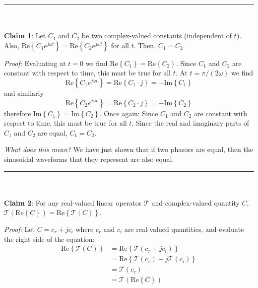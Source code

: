 \rule{3in}{1pt}\\~\\

{\bf Claim 1}: Let $C_1$ and $C_2$ be two complex-valued constants (independent of $t$).  Also,  $\mbox{Re} \left\{ C_1 e^{j\omega t} \right\} = \mbox{Re} \left\{ C_2 e^{j\omega t} \right\}$ for all $t$.  Then, $C_1=C_2$. 

{\it Proof:} Evaluating at $t=0$ we find $\mbox{Re} \left\{ C_1 \right\} = \mbox{Re} \left\{ C_2 \right\}$.  Since $C_1$ and $C_2$ are constant with respect to time, this must be true for all $t$.  At $t=\pi/(2\omega)$ we find
%
\begin{equation}
\mbox{R{e}} \left\{ C_1 e^{j\omega t} \right\} = \mbox{R{e}} \left\{ C_1 \cdot j \right\} = -\mbox{Im} \left\{ C_1 \right\}
\nonumber
\end{equation}
%
and similarly
%
\begin{equation}
\mbox{R{e}} \left\{ C_2 e^{j\omega t} \right\} = \mbox{R{e}} \left\{ C_2 \cdot j \right\} = -\mbox{Im} \left\{ C_2 \right\}
\nonumber
\end{equation}
%
therefore $\mbox{Im} \left\{ C_1 \right\} = \mbox{Im} \left\{ C_2 \right\}$. Once again: Since $C_1$ and $C_2$ are constant with respect to time, this must be true for all $t$.  Since the real and imaginary parts of $C_1$ and $C_2$ are equal, $C_1 = C_2$. 

{\it What does this mean?} We have just shown that if two phasors are equal, then the sinusoidal waveforms that they represent are also equal. 

\rule{3in}{1pt}\\~\\

{\bf Claim 2}:  For any real-valued linear operator $\mathcal{T}$ and complex-valued quantity $C$, $\mathcal{T}( \mbox{Re}\left\{ C \right\} ) = \mbox{Re}\left\{ \mathcal{T}(C) \right\}$.

{\it Proof:} Let $C = c_r + jc_i$ where $c_r$ and $c_i$ are real-valued quantities, and evaluate the right side of the equation:
%
\begin{equation}
\begin{split}
\mbox{Re}\left\{ \mathcal{T}(C) \right\}& = \mbox{Re}\left\{ \mathcal{T}(c_r + jc_i) \right\} \\
                                       ~& = \mbox{Re}\left\{ \mathcal{T}(c_r) + j\mathcal{T}(c_i) \right\} \\
                                       ~& = \mathcal{T}(c_r) \\
                                       ~& = \mathcal{T}( \mbox{Re}\left\{ C \right\} )
\end{split}
\nonumber
\end{equation}

